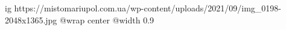  
 
 
 
 

\ifcmt
  ig https://mistomariupol.com.ua/wp-content/uploads/2021/09/img_0198-2048x1365.jpg
  @wrap center
  @width 0.9
\fi
